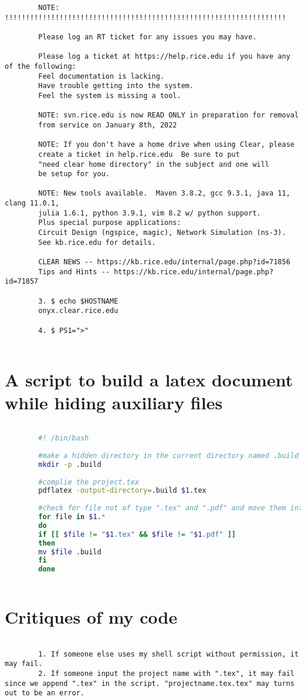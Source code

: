 \documentclass[a4paper]{article}
\begin{document}
\begin{verbatim}
		NOTE: !!!!!!!!!!!!!!!!!!!!!!!!!!!!!!!!!!!!!!!!!!!!!!!!!!!!!!!!!!!!!!!!!!!
		
		Please log an RT ticket for any issues you may have.
		
		Please log a ticket at https://help.rice.edu if you have any of the following:
		Feel documentation is lacking.
		Have trouble getting into the system.
		Feel the system is missing a tool.
		
		NOTE: svn.rice.edu is now READ ONLY in preparation for removal 
		from service on January 8th, 2022
		
		NOTE: If you don't have a home drive when using Clear, please 
		create a ticket in help.rice.edu  Be sure to put 
		"need clear home directory" in the subject and one will 
		be setup for you.
		
		NOTE: New tools available.  Maven 3.8.2, gcc 9.3.1, java 11, clang 11.0.1,
		julia 1.6.1, python 3.9.1, vim 8.2 w/ python support.  
		Plus special purpose applications: 
		Circuit Design (ngspice, magic), Network Simulation (ns-3).
		See kb.rice.edu for details.
		
		CLEAR NEWS -- https://kb.rice.edu/internal/page.php?id=71856
		Tips and Hints -- https://kb.rice.edu/internal/page.php?id=71857

		3. $ echo $HOSTNAME
		onyx.clear.rice.edu
		
		4. $ PS1=">"
		
	\end{verbatim}
	
	\section{A script to build a latex document while hiding auxiliary files}
	
	\begin{lstlisting}[basicstyle=\ttfamily, language=bash, caption={Content of "clean-build.sh"}, captionpos=b]
		
		#! /bin/bash
		
		#make a hidden directory in the current directory named .build and avoid print a warning using "-p"
		mkdir -p .build
		
		#complie the project.tex 
		pdflatex -output-directory=.build $1.tex
		
		#check for file not of type ".tex" and ".pdf" and move them into .build
		for file in $1.*
		do
		if [[ $file != "$1.tex" && $file != "$1.pdf" ]]
		then
		mv $file .build
		fi
		done
		
	\end{lstlisting}
	
	\section{Critiques of my code}
	\begin{verbatim}
		
		1. If someone else uses my shell script without permission, it may fail.
		2. If someone input the project name with ".tex", it may fail since we append ".tex" in the script. "projectname.tex.tex" may turns out to be an error.
		
	\end{verbatim}
\end{document}
